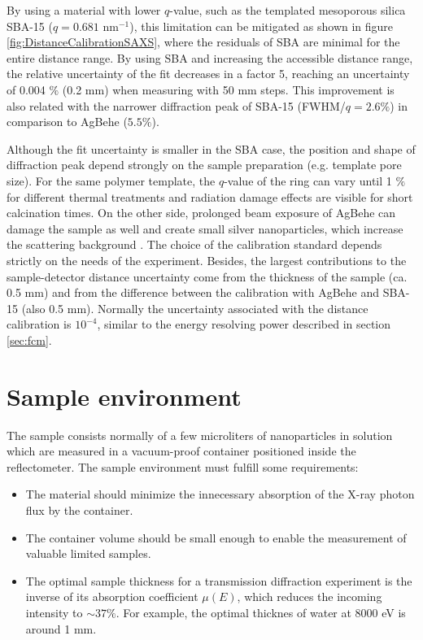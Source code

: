 By using a material with lower $q$-value, such as the templated mesoporous silica SBA-15 \citep{zhao_triblock_1998} ($q=0.681$ nm$^{-1}$), this limitation can be mitigated as shown in figure \ref{fig:DistanceCalibrationSAXS}, where the residuals of SBA are minimal for the entire distance range. By using SBA and increasing the accessible distance range, the relative uncertainty of the fit decreases in a factor 5, reaching an uncertainty of 0.004 $\%$ (0.2 mm) when measuring with 50 mm steps. This improvement is also related with the narrower diffraction peak of SBA-15 (FWHM/$q=2.6\%$) in comparison to AgBehe ($5.5\%$).

Although the fit uncertainty is smaller in the SBA case, the position and shape of diffraction peak depend strongly on the sample preparation (e.g. template pore size). For the same polymer template, the $q$-value of the ring can vary until 1 $\%$ for different thermal treatments and radiation damage effects are visible for short calcination times. On the other side, prolonged beam exposure of AgBehe can damage the sample as well and create small silver nanoparticles, which increase the scattering background \cite{liu_thermal_2006}. The choice of the calibration standard depends strictly on the needs of the experiment. Besides, the largest contributions to the sample-detector distance uncertainty come from the thickness of the sample (ca. 0.5 mm) and from the difference between the calibration with AgBehe and SBA-15 (also 0.5 mm). Normally the uncertainty associated with the distance calibration is $10^{-4}$, similar to the energy resolving power described in section \ref{sec:fcm}.

\section{Sample environment}

The sample consists normally of a few microliters of nanoparticles in solution which are measured in a vacuum-proof container positioned inside the reflectometer. The sample environment must fulfill some requirements:

\begin{itemize}
        \item The material should minimize the innecessary absorption of the X-ray photon flux by the container.
        \item The container volume should be small enough to enable the measurement of valuable limited samples.
        \item The optimal sample thickness for a transmission diffraction experiment is the inverse of its absorption coefficient $\mu(E)$, which reduces the incoming intensity to $\sim37\%$. For example, the optimal thicknes of water at 8000 eV is around 1 mm.
\end{itemize}

